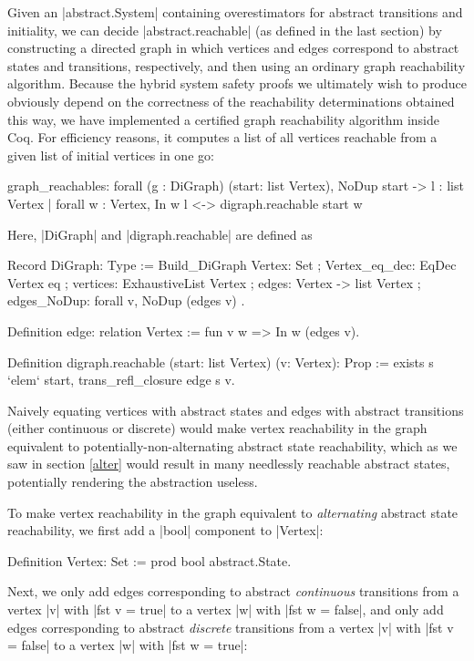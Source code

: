 \documentclass[runningheads]{llncs}
\begin{document}
Given an |abstract.System| containing overestimators for abstract transitions and initiality, we can decide |abstract.reachable| (as defined in the last section) by constructing a directed graph in which vertices and edges correspond to abstract states and transitions, respectively, and then using an ordinary graph reachability algorithm. Because the hybrid system safety proofs we ultimately wish to produce obviously depend on the correctness of the reachability determinations obtained this way, we have implemented a certified graph reachability algorithm inside Coq.  For efficiency reasons, it computes a list of all vertices reachable from a given list of initial vertices in one go:
\begin{code}
graph_reachables: forall (g : DiGraph) (start: list Vertex), NoDup start ->
  {l : list Vertex | forall w : Vertex, In w l <-> digraph.reachable start w}
\end{code}
Here, |DiGraph| and |digraph.reachable| are defined as
\begin{code}
Record DiGraph: Type := Build_DiGraph
  { Vertex: Set
  ; Vertex_eq_dec: EqDec Vertex eq
  ; vertices: ExhaustiveList Vertex
  ; edges: Vertex -> list Vertex
  ; edges_NoDup: forall v, NoDup (edges v)
  }.

Definition edge: relation Vertex := fun v w => In w (edges v).

Definition digraph.reachable (start: list Vertex) (v: Vertex): Prop :=
  exists s `elem` start, trans_refl_closure edge s v.
\end{code}

Naively equating vertices with abstract states and edges with abstract transitions (either continuous or discrete) would make vertex reachability in the graph equivalent to potentially-non-alternating abstract state reachability, which as we saw in section \ref{alter} would result in many needlessly reachable abstract states, potentially rendering the abstraction useless.

To make vertex reachability in the graph equivalent to \emph{alternating} abstract state reachability, we first add a |bool| component to |Vertex|:
\begin{code}
Definition Vertex: Set := prod bool abstract.State.
\end{code}
Next, we only add edges corresponding to abstract \emph{continuous} transitions from a vertex |v| with |fst v = true| to a vertex |w| with |fst w = false|, and only add edges corresponding to abstract \emph{discrete} transitions from a vertex |v| with |fst v = false| to a vertex |w| with |fst w = true|:
\end{document}
